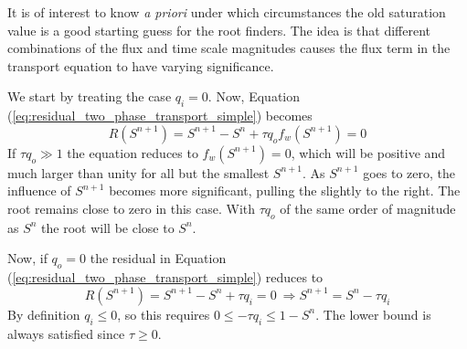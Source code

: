 It is of interest to know \emph{a priori} under which circumstances the old saturation value is a good starting guess for the root finders. The idea is that different combinations of the flux and time scale magnitudes causes the flux term in the transport equation to have varying significance.

We start by treating the case $q_i = 0$. Now, Equation (\ref{eq:residual_two_phase_transport_simple}) becomes
\begin{equation*}
R(S^{n+1}) = S^{n+1} - S^{n} + \tau q_o f_w(S^{n+1}) = 0
\end{equation*}
If $\tau q_o \gg 1$ the equation reduces to $f_w(S^{n+1}) = 0$, which will be positive and much larger than unity for all but the smallest $S^{n+1}$. As $S^{n+1}$ goes to zero, the influence of $S^{n+1}$ becomes more significant, pulling the slightly to the right. The root remains close to zero in this case. With $\tau q_o$ of the same order of magnitude as $S^n$ the root will be close to $S^n$. 

Now, if $q_o = 0$ the residual in Equation (\ref{eq:residual_two_phase_transport_simple}) reduces to
\begin{equation*}
R(S^{n+1}) = S^{n+1} - S^{n} + \tau q_i = 0 ~ \Rightarrow S^{n+1} = S^n - \tau q_i 
\end{equation*}
By definition $q_i \leq 0$, so this requires $0 \leq - \tau q_i  \leq 1 - S^n$. The lower bound is always satisfied since $\tau \geq 0$.

